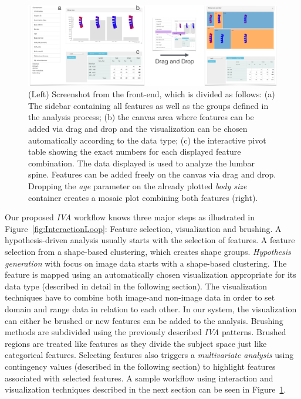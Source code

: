 \documentclass[journal]{style/vgtc} 			          %
\begin{document}
\begin{figure}[htb]
 \centering
 \includegraphics[width=1\textwidth, resolution=300]{figures/visualization}
 \caption{(Left) Screenshot from the front-end, which is divided as follows: (a) The sidebar containing all features as well as the groups defined in the analysis process; (b) the canvas area where features can be added via drag and drop and the visualization can be chosen automatically according to the data type; (c) the interactive pivot table showing the exact numbers for each displayed feature combination. The data displayed is used to analyze the lumbar spine. Features can be added freely on the canvas via drag and drop. Dropping the \emph{age} parameter on the already plotted \emph{body size} container creates a mosaic plot combining both features (right).
 }
 \label{fig:visualization}
\end{figure}
Our proposed \emph{IVA} workflow knows three major steps as illustrated in Figure~\ref{fig:InteractionLoop}: Feature selection, visualization and brushing.
%
A hypothesis-driven analysis usually starts with the selection of features.
%
A feature selection from a shape-based clustering, which creates shape groups.
%
\emph{Hypothesis generation} with focus on image data starts with a shape-based clustering.
%
The feature is mapped using an automatically chosen visualization appropriate for its data type (described in detail in the following section).
%
The visualization techniques have to combine both image-and non-image data in order to set domain and range data in relation to each other.
%
In our system, the visualization can either be brushed or new features can be added to the analysis. 
%
Brushing methods are subdivided using the previously described \emph{IVA} patterns.
%
Brushed regions are treated like features as they divide the subject space just like categorical features. %
%
Selecting features also triggers a \emph{multivariate analysis} using contingency values (described in the following section) to highlight features associated with selected features.
%
%
%
A sample workflow using interaction and visualization techniques described in the next section can be seen in Figure~\ref{fig:visualization}.
\end{document}
